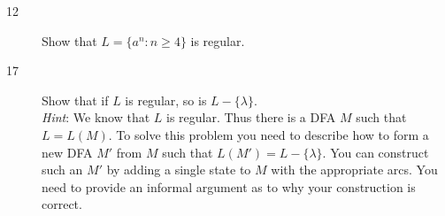 \documentclass[12pt]{article}
\begin{document}
\begin{description}
    \item[12] Show that $L = \{a^n : n \ge 4\}$ is regular.


    \item[17] Show that if $L$ is regular, so is $L - \{\lambda\}$.\\
              \emph{Hint}: We know that $L$ is regular. Thus there is a
              DFA $M$ such that $L = L(M)$. To solve this problem you
              need to describe how to form a new DFA $M'$ from $M$ such
              that $L(M') = L - \{\lambda\}$.  You can construct such an
              $M'$ by adding a single state to $M$ with the appropriate
              arcs. You need to provide an informal argument as to why
              your construction is correct.

\end{description}
\end{document}
